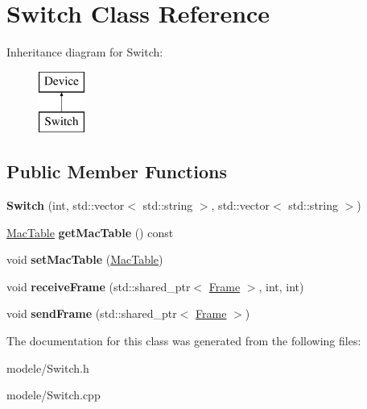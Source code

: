 \hypertarget{class_switch}{\section{Switch Class Reference}
\label{class_switch}
}
Inheritance diagram for Switch\-:\begin{figure}[H]
\begin{center}
\leavevmode
\includegraphics[height=2.000000cm]{class_switch}
\end{center}
\end{figure}
\subsection*{Public Member Functions}
\begin{DoxyCompactItemize}
\item 
\hypertarget{class_switch_a7937e9ebd016855f17554dd77ef504d9}{{\bfseries Switch} (int, std\-::vector$<$ std\-::string $>$, std\-::vector$<$ std\-::string $>$)}\label{class_switch_a7937e9ebd016855f17554dd77ef504d9}

\item 
\hypertarget{class_switch_a6ecdca5fbacd09f849b426a96a2a3e9f}{\hyperlink{class_mac_table}{Mac\-Table} {\bfseries get\-Mac\-Table} () const }\label{class_switch_a6ecdca5fbacd09f849b426a96a2a3e9f}

\item 
\hypertarget{class_switch_aba524bed1ac16f35550db953c418d46f}{void {\bfseries set\-Mac\-Table} (\hyperlink{class_mac_table}{Mac\-Table})}\label{class_switch_aba524bed1ac16f35550db953c418d46f}

\item 
\hypertarget{class_switch_a815666b46aa1c8b3756cd154743d31a3}{void {\bfseries receive\-Frame} (std\-::shared\-\_\-ptr$<$ \hyperlink{class_frame}{Frame} $>$, int, int)}\label{class_switch_a815666b46aa1c8b3756cd154743d31a3}

\item 
\hypertarget{class_switch_ac9fbe7761ddd64f7fbbf5f4c3fe8404a}{void {\bfseries send\-Frame} (std\-::shared\-\_\-ptr$<$ \hyperlink{class_frame}{Frame} $>$)}\label{class_switch_ac9fbe7761ddd64f7fbbf5f4c3fe8404a}

\end{DoxyCompactItemize}


The documentation for this class was generated from the following files\-:\begin{DoxyCompactItemize}
\item 
modele/Switch.\-h\item 
modele/Switch.\-cpp\end{DoxyCompactItemize}
